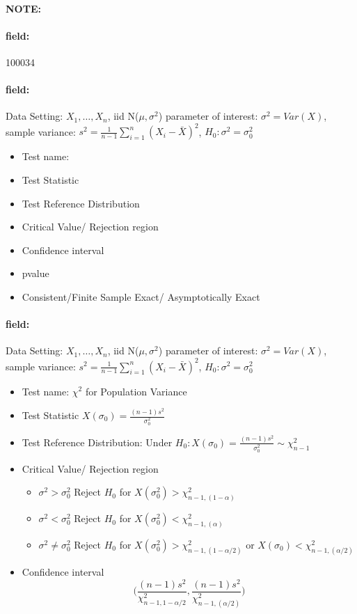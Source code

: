 \documentclass[12pt]{article}
\newenvironment{note}{\paragraph{NOTE:}}{}
\newenvironment{field}{\paragraph{field:}}{}
\begin{document}
\begin{note} \begin{field} \tiny 100034 \end{field}
 \begin{field}
  Data Setting: $X_1, \ldots, X_n$, iid N($\mu,\sigma^2$) parameter of interest: $\sigma^2 = Var(X)$, sample variance: $s^2 = \frac{1}{n-1} \sum_{i=1}^n(X_i - \bar{X})^2$, $H_0: \sigma^2 = \sigma_0^2$
  \begin{itemize}
   \item Test name:
   \item Test Statistic
   \item Test Reference Distribution
   \item Critical Value/ Rejection region
   \item Confidence interval
   \item pvalue
   \item Consistent/Finite Sample Exact/ Asymptotically Exact
  \end{itemize}
 \end{field}
 \begin{field}
  Data Setting: $X_1, \ldots, X_n$, iid N($\mu,\sigma^2$) parameter of interest: $\sigma^2 = Var(X)$, sample variance: $s^2 = \frac{1}{n-1} \sum_{i=1}^n(X_i - \bar{X})^2$, $H_0: \sigma^2 = \sigma_0^2$
  \begin{itemize}
   \item Test name: $\chi^2$ for Population Variance
   \item Test Statistic $X(\sigma_0) = \frac{(n-1)s^2}{\sigma_0^2}$
   \item Test Reference Distribution: Under $H_0: X(\sigma_0) = \frac{(n-1)s^2}{\sigma_0^2} \sim \chi_{n-1}^2$
   \item Critical Value/ Rejection region
         \begin{itemize}
          \item  $\sigma^2 > \sigma_0^2$ Reject $H_0$ for $X(\sigma_0^2) > \chi^2_{n-1,(1-\alpha)}$
          \item $\sigma^2 < \sigma_0^2$ Reject $H_0$ for $X(\sigma_0^2) < \chi^2_{n-1,(\alpha)}$
          \item $\sigma^2 \neq \sigma_0^2$ Reject $H_0$ for $X(\sigma_0^2) > \chi^2_{n-1,(1 - \alpha/2)}$ or $X(\sigma_0) < \chi^2_{n-1,(\alpha/2)}$
         \end{itemize}
   \item Confidence interval  $$ \bigg( \frac{(n-1)s^2}{\chi^2_{n-1,1 - \alpha/2}}, \frac{(n-1)s^2}{\chi^2_{n-1,(\alpha/2)}}\bigg)$$

\end{itemize}
\end{field}
\end{note}
\end{document}
